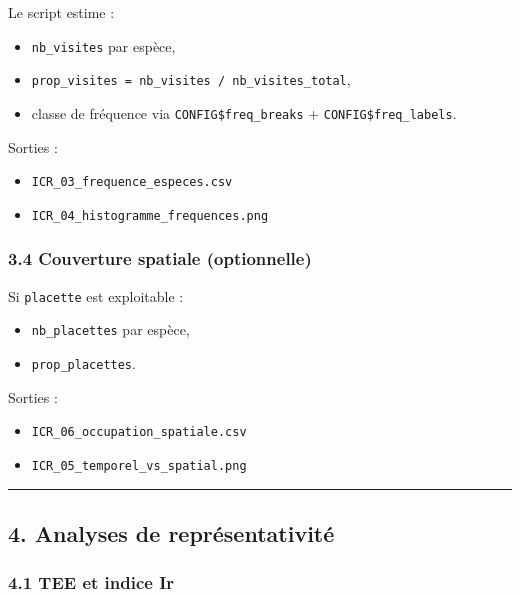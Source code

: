 Le script estime :

\begin{itemize}
\tightlist
\item
  \texttt{nb\_visites} par espèce,
\item
  \texttt{prop\_visites\ =\ nb\_visites\ /\ nb\_visites\_total},
\item
  classe de fréquence via \texttt{CONFIG\$freq\_breaks} +
  \texttt{CONFIG\$freq\_labels}.
\end{itemize}

Sorties :

\begin{itemize}
\tightlist
\item
  \texttt{ICR\_03\_frequence\_especes.csv}
\item
  \texttt{ICR\_04\_histogramme\_frequences.png}
\end{itemize}

\subsubsection{3.4 Couverture spatiale
(optionnelle)}\label{couverture-spatiale-optionnelle}

Si \texttt{placette} est exploitable :

\begin{itemize}
\tightlist
\item
  \texttt{nb\_placettes} par espèce,
\item
  \texttt{prop\_placettes}.
\end{itemize}

Sorties :

\begin{itemize}
\tightlist
\item
  \texttt{ICR\_06\_occupation\_spatiale.csv}
\item
  \texttt{ICR\_05\_temporel\_vs\_spatial.png}
\end{itemize}

\begin{center}\rule{0.5\linewidth}{0.5pt}\end{center}

\subsection{4. Analyses de
représentativité}\label{analyses-de-repruxe9sentativituxe9}

\subsubsection{4.1 TEE et indice Ir}\label{tee-et-indice-ir}

